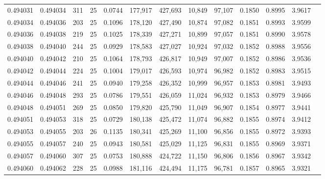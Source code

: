 \begin{tabular}{rrrrrrrrrrrrr}
0.494031 & 0.494034 &   311 &  25 &                                     0.0744 & 177,917 & 427,693 &  10,849 &  97,107 & 0.1850 & 0.8995 & 3.9617 \\
0.494034 & 0.494036 &   203 &  25 &                                     0.1096 & 178,120 & 427,490 &  10,874 &  97,082 & 0.1851 & 0.8993 & 3.9599 \\
0.494036 & 0.494038 &   219 &  25 &                                     0.1025 & 178,339 & 427,271 &  10,899 &  97,057 & 0.1851 & 0.8990 & 3.9578 \\
0.494038 & 0.494040 &   244 &  25 &                                     0.0929 & 178,583 & 427,027 &  10,924 &  97,032 & 0.1852 & 0.8988 & 3.9556 \\
0.494040 & 0.494042 &   210 &  25 &                                     0.1064 & 178,793 & 426,817 &  10,949 &  97,007 & 0.1852 & 0.8986 & 3.9536 \\
0.494042 & 0.494044 &   224 &  25 &                                     0.1004 & 179,017 & 426,593 &  10,974 &  96,982 & 0.1852 & 0.8983 & 3.9515 \\
0.494044 & 0.494046 &   241 &  25 &                                     0.0940 & 179,258 & 426,352 &  10,999 &  96,957 & 0.1853 & 0.8981 & 3.9493 \\
0.494046 & 0.494048 &   293 &  25 &                                     0.0786 & 179,551 & 426,059 &  11,024 &  96,932 & 0.1853 & 0.8979 & 3.9466 \\
0.494048 & 0.494051 &   269 &  25 &                                     0.0850 & 179,820 & 425,790 &  11,049 &  96,907 & 0.1854 & 0.8977 & 3.9441 \\
0.494051 & 0.494053 &   318 &  25 &                                     0.0729 & 180,138 & 425,472 &  11,074 &  96,882 & 0.1855 & 0.8974 & 3.9412 \\
0.494053 & 0.494055 &   203 &  26 &                                     0.1135 & 180,341 & 425,269 &  11,100 &  96,856 & 0.1855 & 0.8972 & 3.9393 \\
0.494055 & 0.494057 &   240 &  25 &                                     0.0943 & 180,581 & 425,029 &  11,125 &  96,831 & 0.1855 & 0.8969 & 3.9371 \\
0.494057 & 0.494060 &   307 &  25 &                                     0.0753 & 180,888 & 424,722 &  11,150 &  96,806 & 0.1856 & 0.8967 & 3.9342 \\
0.494060 & 0.494062 &   228 &  25 &                                     0.0988 & 181,116 & 424,494 &  11,175 &  96,781 & 0.1857 & 0.8965 & 3.9321 \\

\end{tabular}
